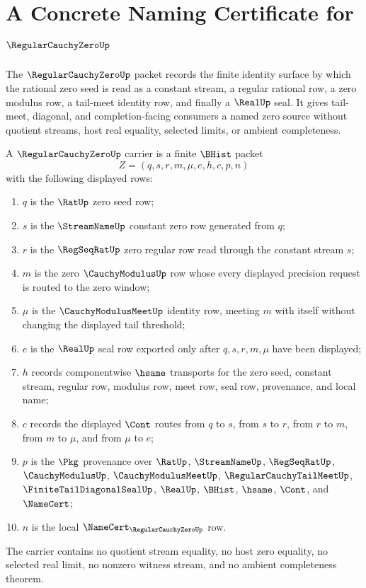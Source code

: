 \chapter{A Concrete Naming Certificate for $\RegularCauchyZeroUp$}
\label{ch:concrete-instances-regularcauchyzero-namecert}

The $\RegularCauchyZeroUp$ packet records the finite identity surface by which the rational zero seed is read as a constant stream, a regular rational row, a zero modulus row, a tail-meet identity row, and finally a $\RealUp$ seal. It gives tail-meet, diagonal, and completion-facing consumers a named zero source without quotient streams, host real equality, selected limits, or ambient completeness.

\begin{definition}
\label{def:regular-cauchy-zero-carrier}
A $\RegularCauchyZeroUp$ carrier is a finite $\BHist$ packet
$$
Z=(q,s,r,m,\mu,e,h,c,p,n)
$$
with the following displayed rows:
\begin{enumerate}
\item $q$ is the $\RatUp$ zero seed row;
\item $s$ is the $\StreamNameUp$ constant zero row generated from $q$;
\item $r$ is the $\RegSeqRatUp$ zero regular row read through the constant stream $s$;
\item $m$ is the zero $\CauchyModulusUp$ row whose every displayed precision request is routed to the zero window;
\item $\mu$ is the $\CauchyModulusMeetUp$ identity row, meeting $m$ with itself without changing the displayed tail threshold;
\item $e$ is the $\RealUp$ seal row exported only after $q,s,r,m,\mu$ have been displayed;
\item $h$ records componentwise $\hsame$ transports for the zero seed, constant stream, regular row, modulus row, meet row, seal row, provenance, and local name;
\item $c$ records the displayed $\Cont$ routes from $q$ to $s$, from $s$ to $r$, from $r$ to $m$, from $m$ to $\mu$, and from $\mu$ to $e$;
\item $p$ is the $\Pkg$ provenance over $\RatUp$, $\StreamNameUp$, $\RegSeqRatUp$, $\CauchyModulusUp$, $\CauchyModulusMeetUp$, $\RegularCauchyTailMeetUp$, $\FiniteTailDiagonalSealUp$, $\RealUp$, $\BHist$, $\hsame$, $\Cont$, and $\NameCert$;
\item $n$ is the local $\NameCert_{\RegularCauchyZeroUp}$ row.
\end{enumerate}
The carrier contains no quotient stream equality, no host zero equality, no selected real limit, no nonzero witness stream, and no ambient completeness theorem.
\end{definition}

